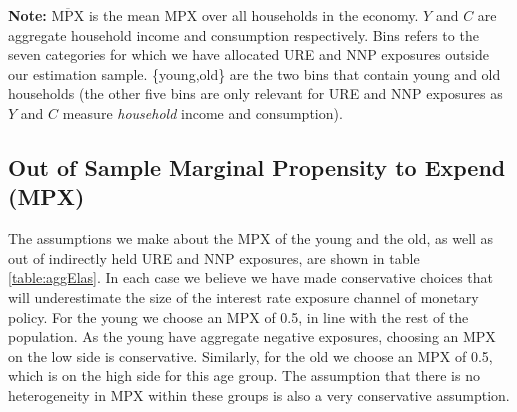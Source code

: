 \documentclass[titlepage]{\econtex}\newcommand{\texname}{ConsumptionHeterogeneity}
\begin{document}
\begin{minipage}{1.0\textwidth}
	\begin{center}
		\label{table:auclertSS}
	\end{center}
	\tiny \textbf{Note: } $\overline{\text{MPX}}$ is the mean MPX over all households in the economy. $Y$ and $C$ are aggregate household income and consumption respectively. Bins refers to the seven categories for which we have allocated URE and NNP exposures outside our estimation sample. \{young,old\} are the two bins that contain young and old households (the other five bins are only relevant for URE and NNP exposures as $Y$ and $C$ measure \textit{household} income and consumption).
\end{minipage}

\subsection{Out of Sample Marginal Propensity to Expend (MPX)}
The assumptions we make about the MPX of the young and the old, as well as out of indirectly held URE and NNP exposures, are shown in table \ref{table:aggElas}. In each case we believe we have made conservative choices that will underestimate the size of the interest rate exposure channel of monetary policy. For the young we choose an MPX of 0.5, in line with the rest of the population. As the young have aggregate negative exposures, choosing an MPX on the low side is conservative. Similarly, for the old we choose an MPX of 0.5, which is on the high side for this age group. The assumption that there is no heterogeneity in MPX within these groups is also a very conservative assumption.
\end{document}
